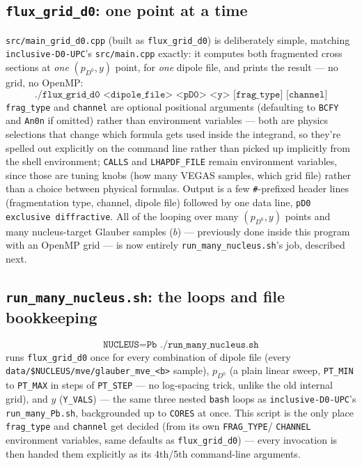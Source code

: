 \documentclass[11pt]{article}
\begin{document}
\subsection{\texttt{flux\_grid\_d0}: one point at a time}

\texttt{src/main\_grid\_d0.cpp} (built as \texttt{flux\_grid\_d0}) is
deliberately simple, matching \texttt{inclusive-D0-UPC}'s
\texttt{src/main.cpp} exactly: it computes both fragmented cross sections
at \emph{one} $(p_{D^0},y)$ point, for \emph{one} dipole file, and prints
the result — no grid, no OpenMP:
\[
\texttt{./flux\_grid\_d0 <dipole\_file> <pD0> <y> [frag\_type] [channel]}
\]
\texttt{frag\_type} and \texttt{channel} are optional positional arguments
(defaulting to \texttt{BCFY} and \texttt{An0n} if omitted) rather than
environment variables — both are physics selections that change which
formula gets used inside the integrand, so they're spelled out explicitly
on the command line rather than picked up implicitly from the shell
environment; \texttt{CALLS} and \texttt{LHAPDF\_FILE} remain environment
variables, since those are tuning knobs (how many VEGAS samples, which
grid file) rather than a choice between physical formulas. Output is a
few \texttt{\#}-prefixed header lines (fragmentation type, channel,
dipole file) followed by one data line,
\texttt{pD0 exclusive diffractive}. All of the looping over many
$(p_{D^0},y)$ points and many nucleus-target Glauber samples ($b$) —
previously done inside this program with an OpenMP grid — is now entirely
\texttt{run\_many\_nucleus.sh}'s job, described next.

\subsection{\texttt{run\_many\_nucleus.sh}: the loops and file bookkeeping}

\[
\texttt{NUCLEUS=Pb ./run\_many\_nucleus.sh}
\]
runs \texttt{flux\_grid\_d0} once for every combination of dipole file
(every \texttt{data/\$NUCLEUS/mve/glauber\_mve\_<b>} sample), $p_{D^0}$
(a plain linear sweep, \texttt{PT\_MIN} to \texttt{PT\_MAX} in steps of
\texttt{PT\_STEP} — no log-spacing trick, unlike the old internal grid),
and $y$ (\texttt{Y\_VALS}) — the same three nested \texttt{bash} loops as
\texttt{inclusive-D0-UPC}'s \texttt{run\_many\_Pb.sh}, backgrounded up to
\texttt{CORES} at once. This script is the only place \texttt{frag\_type}
and \texttt{channel} get decided (from its own \texttt{FRAG\_TYPE}/
\texttt{CHANNEL} environment variables, same defaults as
\texttt{flux\_grid\_d0}) — every invocation is then handed them explicitly
as its 4th/5th command-line arguments.
\end{document}
